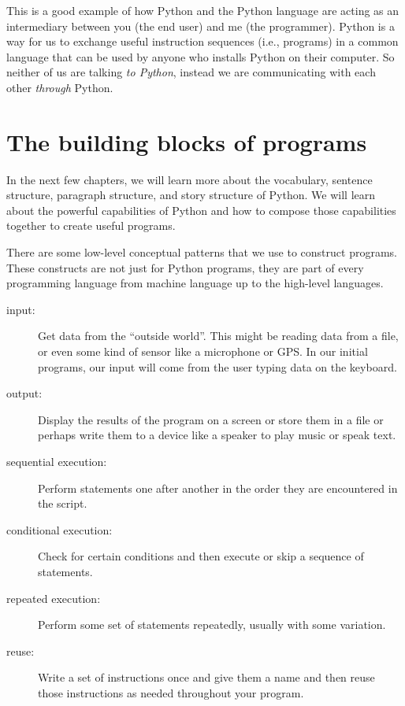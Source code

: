 This is a good example of how Python and the Python language are acting as an intermediary
between you (the end user) and me (the programmer).  Python is a way for us to exchange useful
instruction sequences (i.e., programs) in a common language that can be used by anyone who 
installs Python on their computer.  So neither of us are talking {\em to Python},
instead we are communicating with each other {\em through} Python.

\section{The building blocks of programs}

In the next few chapters, we will learn more about the vocabulary, sentence structure,
paragraph structure, and story structure of Python.  We will learn about the powerful
capabilities of Python and how to compose those capabilities together to create useful
programs.

There are some low-level conceptual patterns that we use to construct programs.  These
constructs are not just for Python programs, they are part of every programming language
from machine language up to the high-level languages.

\begin{description}

\item[input:] Get data from the ``outside world''.  This might be 
reading data from a file, or even some kind of sensor like 
a microphone or GPS.  In our initial programs, our input will come from the user
typing data on the keyboard.

\item[output:] Display the results of the program on a screen
or store them in a file or perhaps write them to a device like a
speaker to play music or speak text.

\item[sequential execution:] Perform statements one after
another in the order they are encountered in the script.

\item[conditional execution:] Check for certain conditions and
then execute or skip a sequence of statements.

\item[repeated execution:] Perform some set of statements 
repeatedly, usually with
some variation.

\item[reuse:] Write a set of instructions once and give them a name
and then reuse those instructions as needed throughout your program.

\end{description}

